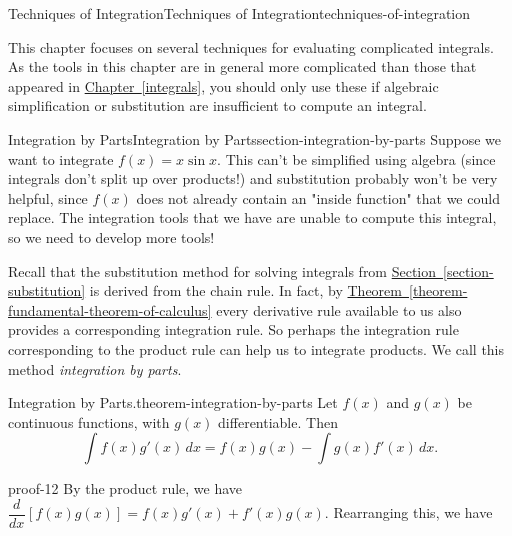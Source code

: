 \documentclass[oneside,10pt,]{book}
\numberwithin{equation}{section}
\newcommand{\dv}[3][]{\dfrac{d^{#1} #2}{d #3^{#1}}}
\begin{document}
\begin{chapterptx}{Techniques of Integration}{}{Techniques of Integration}{}{}{techniques-of-integration}
\begin{introduction}{}%
\hypertarget{p-494}{}%
This chapter focuses on several techniques for evaluating complicated integrals. As the tools in this chapter are in general more complicated than those that appeared in \hyperref[integrals]{Chapter~\ref{integrals}}, you should only use these if algebraic simplification or substitution are insufficient to compute an integral.%
\end{introduction}%
%
%
\typeout{************************************************}
\typeout{************************************************}
%
\begin{sectionptx}{Integration by Parts}{}{Integration by Parts}{}{}{section-integration-by-parts}
\hypertarget{p-495}{}%
Suppose we want to integrate \(f(x) = x\sin x\). This can't be simplified using algebra (since integrals don't split up over products!) and substitution probably won't be very helpful, since \(f(x)\) does not already contain an "inside function" that we could replace. The integration tools that we have are unable to compute this integral, so we need to develop more tools!%
\par
\hypertarget{p-496}{}%
Recall that the substitution method for solving integrals from \hyperref[section-substitution]{Section~\ref{section-substitution}} is derived from the chain rule. In fact, by \hyperref[theorem-fundamental-theorem-of-calculus]{Theorem~\ref{theorem-fundamental-theorem-of-calculus}} every derivative rule available to us also provides a corresponding integration rule. So perhaps the integration rule corresponding to the product rule can help us to integrate products. We call this method \emph{integration by parts}.%
\begin{theorem}{Integration by Parts.}{}{theorem-integration-by-parts}%
\hypertarget{p-497}{}%
Let \(f(x)\) and \(g(x)\) be continuous functions, with \(g(x)\) differentiable. Then%
%
\begin{equation*}
\int f(x)g'(x)\,dx = f(x)g(x) - \int g(x)f'(x)\,dx.
\end{equation*}
\end{theorem}
\begin{proofptx}{}{proof-12}
\hypertarget{p-498}{}%
By the product rule, we have \(\dv{}{x}[f(x)g(x)] = f(x)g'(x) + f'(x)g(x)\). Rearranging this, we have%

\end{proofptx}
\end{sectionptx}
\end{chapterptx}
\end{document}

